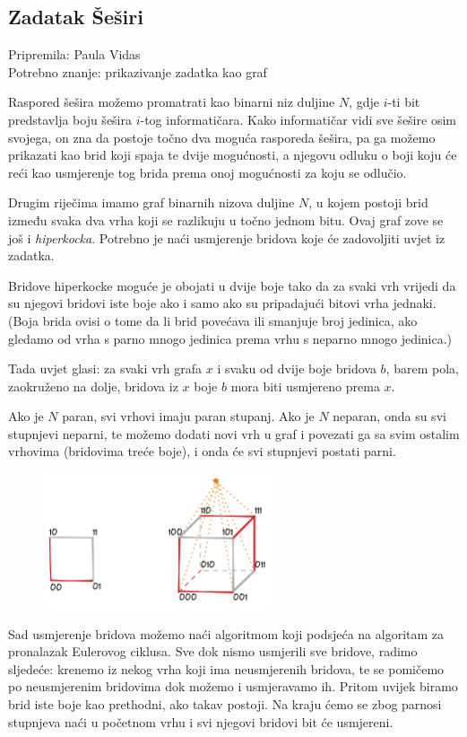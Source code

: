 \subsection*{Zadatak Šeširi}
\textsf{Pripremila: Paula Vidas}\\
\textsf{Potrebno znanje: prikazivanje zadatka kao graf}

Raspored šešira možemo promatrati kao binarni niz duljine $N$, gdje $i$-ti bit
predstavlja boju šešira $i$-tog informatičara.
Kako informatičar vidi sve šešire osim svojega, on zna da postoje točno dva moguća
rasporeda šešira, pa ga možemo prikazati kao brid koji spaja te dvije mogućnosti,
a njegovu odluku o boji koju će reći kao usmjerenje tog brida prema onoj mogućnosti
za koju se odlučio.

Drugim riječima imamo graf binarnih nizova duljine $N$, u kojem postoji brid
između svaka dva vrha koji se razlikuju u točno jednom bitu. Ovaj graf zove se još
i \textit{hiperkocka}. Potrebno je naći usmjerenje bridova koje će zadovoljiti
uvjet iz zadatka.

Bridove hiperkocke moguće je obojati u dvije boje tako da za svaki vrh vrijedi da su njegovi
bridovi iste boje ako i samo ako su pripadajući bitovi vrha jednaki. (Boja brida ovisi o tome
da li brid povećava ili smanjuje broj jedinica, ako gledamo od vrha s parno mnogo jedinica
prema vrhu s neparno mnogo jedinica.)

Tada uvjet glasi: za svaki vrh grafa $x$ i svaku od dvije boje bridova $b$, barem pola,
zaokruženo na dolje, bridova iz $x$ boje $b$ mora biti usmjereno prema $x$.

Ako je $N$ paran, svi vrhovi imaju paran stupanj. Ako je $N$ neparan, onda
su svi stupnjevi neparni, te možemo dodati novi vrh u graf i povezati ga sa svim ostalim
vrhovima (bridovima treće boje), i onda će svi stupnjevi postati parni.

\begin{figure}[H]
    \centering
    \includegraphics[width=0.6\textwidth]{img/sesiri_editorial.excalidraw.png}
\end{figure}

Sad usmjerenje bridova možemo naći algoritmom koji podsjeća na algoritam za pronalazak
Eulerovog ciklusa. Sve dok nismo usmjerili sve bridove, radimo sljedeće: krenemo iz nekog
vrha koji ima neusmjerenih bridova, te se pomičemo po neusmjerenim bridovima dok možemo i usmjeravamo ih.
Pritom uvijek biramo brid iste boje kao prethodni, ako takav postoji.
Na kraju ćemo se zbog parnosi stupnjeva naći u početnom vrhu i svi njegovi bridovi bit će usmjereni.
